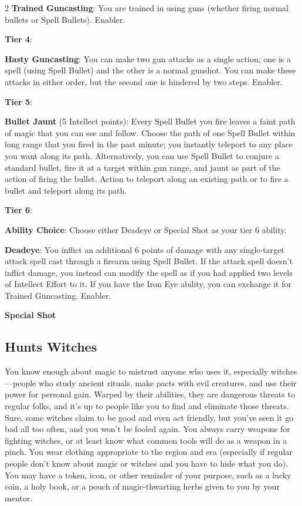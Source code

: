 \begin{multicols}{2}
\textbf{Trained Guncasting}: You are trained in using guns (whether firing normal bullets or Spell Bullets). Enabler.

\textbf{Tier 4}:

\textbf{Hasty Guncasting}: You can make two gun attacks as a single action; one is a spell (using Spell Bullet) and the other is a normal gunshot. You can make these attacks in either order, but the second one is hindered by two steps. Enabler.

\textbf{Tier 5}:

\textbf{Bullet Jaunt} (5 Intellect points): Every Spell Bullet you fire leaves a faint path of magic that you can see and follow. Choose the path of one Spell Bullet within long range that you fired in the past minute; you instantly teleport to any place you want along its path. Alternatively, you can use Spell Bullet to conjure a standard bullet, fire it at a target within gun range, and jaunt as part of the action of firing the bullet. Action to teleport along an existing path or to fire a bullet and teleport along its path.

\textbf{Tier 6}:

\textbf{Ability Choice}: Choose either Deadeye or Special Shot as your tier 6 ability.

\textbf{Deadeye}: You inflict an additional 6 points of damage with any single-target attack spell cast through a firearm using Spell Bullet. If the attack spell doesn’t inflict damage, you instead can modify the spell as if you had applied two levels of Intellect Effort to it. If you have the Iron Eye ability, you can exchange it for Trained Guncasting. Enabler.

\textbf{Special Shot}

\subsection{Hunts Witches}

You know enough about magic to mistrust anyone who uses it, especially witches—people who study ancient rituals, make pacts with evil creatures, and use their power for personal gain. Warped by their abilities, they are dangerous threats to regular folks, and it’s up to people like you to find and eliminate those threats. Sure, some witches claim to be good and even act friendly, but you’ve seen it go bad all too often, and you won’t be fooled again. You always carry weapons for fighting witches, or at least know what common tools will do as a weapon in a pinch. You wear clothing appropriate to the region and era (especially if regular people don’t know about magic or witches and you have to hide what you do). You may have a token, icon, or other reminder of your purpose, such as a lucky coin, a holy book, or a pouch of magic-thwarting herbs given to you by your mentor.


\end{multicols}
